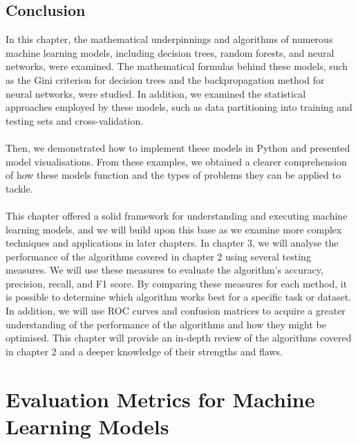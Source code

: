 \documentclass{article}[12pt]
\newcounter{example}[section]
\theoremstyle{definition}
\begin{document}
\newpage

\subsection{Conclusion}

In this chapter, the mathematical underpinnings and algorithms of numerous machine learning models, including decision trees, random forests, and neural networks, were examined. The mathematical formulas behind these models, such as the Gini criterion for decision trees and the backpropagation method for neural networks, were studied. In addition, we examined the statistical approaches employed by these models, such as data partitioning into training and testing sets and cross-validation. 
\\
\\
Then, we demonstrated how to implement these models in Python and presented model visualisations. From these examples, we obtained a clearer comprehension of how these models function and the types of problems they can be applied to tackle. 
\\
\\
This chapter offered a solid framework for understanding and executing machine learning models, and we will build upon this base as we examine more complex techniques and applications in later chapters. In chapter 3, we will analyse the performance of the algorithms covered in chapter 2 using several testing measures. We will use these measures to evaluate the algorithm's accuracy, precision, recall, and F1 score. By comparing these measures for each method, it is possible to determine which algorithm works best for a specific task or dataset. In addition, we will use ROC curves and confusion matrices to acquire a greater understanding of the performance of the algorithms and how they might be optimised. This chapter will provide an in-depth review of the algorithms covered in chapter 2 and a deeper knowledge of their strengths and flaws.

\bigskip

\section{Evaluation Metrics for Machine Learning Models}

\bigskip
\end{document}
